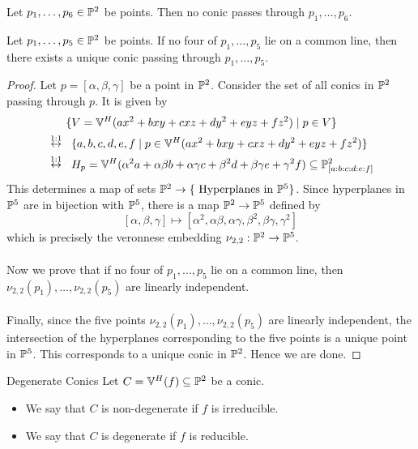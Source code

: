 \documentclass[a4paper]{article}
\begin{document}
\begin{prp}{}{} Let $p_1,\dots,p_6\in\mathbb{P}^2$ be points. Then no conic passes through $p_1,\dots,p_6$. 
\end{prp}

\begin{prp}{}{} Let $p_1,\dots,p_5\in\mathbb{P}^2$ be points. If no four of $p_1,\dots,p_5$ lie on a common line, then there exists a unique conic passing through $p_1,\dots,p_5$. \tcbline
\begin{proof}
Let $p=[\alpha,\beta,\gamma]$ be a point in $\mathbb{P}^2$. Consider the set of all conics in $\mathbb{P}^2$ passing through $p$. It is given by 
\begin{align*}
&\;\;\;\;\;\;\{V=\mathbb{V}^H(ax^2+bxy+cxz+dy^2+eyz+fz^2)\;|\;p\in V\}\\
&\overset{1:1}{\leftrightarrow}\;\;\{a,b,c,d,e,f\;|\;p\in\mathbb{V}^H(ax^2+bxy+cxz+dy^2+eyz+fz^2)\}\\
&\overset{1:1}{\leftrightarrow}\;\;H_p=\mathbb{V}^H(\alpha^2a+\alpha\beta b+\alpha\gamma c+\beta^2d+\beta\gamma e+\gamma^2f)\subseteq\mathbb{P}_{[a:b:c:d:e:f]}^2
\end{align*}
This determines a map of sets $\mathbb{P}^2\to\{\text{ Hyperplanes in }\mathbb{P}^5\}$. Since hyperplanes in $\mathbb{P}^5$ are in bijection with $\mathbb{P}^5$, there is a map $\mathbb{P}^2\to\mathbb{P}^5$ defined by $$[\alpha,\beta,\gamma]\mapsto[\alpha^2,\alpha\beta,\alpha\gamma,\beta^2,\beta\gamma,\gamma^2]$$ which is precisely the veronnese embedding $\nu_{2,2}:\mathbb{P}^2\to\mathbb{P}^5$. \\~\\

Now we prove that if no four of $p_1,\dots,p_5$ lie on a common line, then $\nu_{2,2}(p_1),\dots,\nu_{2,2}(p_5)$ are linearly independent. \\~\\

Finally, since the five points $\nu_{2,2}(p_1),\dots,\nu_{2,2}(p_5)$ are linearly independent, the intersection of the hyperplanes corresponding to the five points is a unique point in $\mathbb{P}^5$. This corresponds to a unique conic in $\mathbb{P}^2$. Hence we are done. 
\end{proof}
\end{prp}

\begin{defn}{Degenerate Conics}{} Let $C=\mathbb{V}^H(f)\subseteq\mathbb{P}^2$ be a conic. 
\begin{itemize}
\item We say that $C$ is non-degenerate if $f$ is irreducible. 
\item We say that $C$ is degenerate if $f$ is reducible. 
\end{itemize}
\end{defn}
\end{document}
